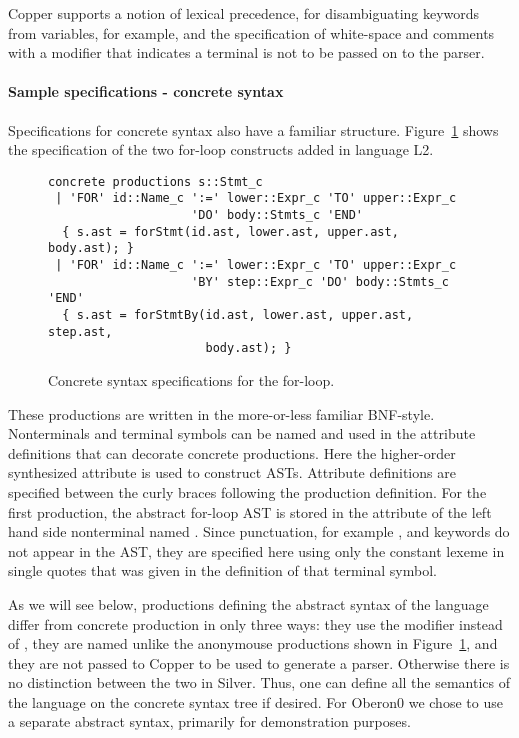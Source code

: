 Copper supports a notion of lexical precedence, for disambiguating
keywords from variables, for example, and the specification of
white-space and comments with a  modifier that indicates
a terminal is not to be passed on to the parser.


\paragraph{Sample specifications - concrete syntax}
Specifications for concrete syntax also have a familiar structure.
Figure~\ref{silver:fig:concrete} shows the specification of the two
for-loop constructs added in language L2.
\begin{figure}
\begin{verbatim}
concrete productions s::Stmt_c
 | 'FOR' id::Name_c ':=' lower::Expr_c 'TO' upper::Expr_c
                    'DO' body::Stmts_c 'END'         
  { s.ast = forStmt(id.ast, lower.ast, upper.ast, body.ast); }
 | 'FOR' id::Name_c ':=' lower::Expr_c 'TO' upper::Expr_c
                    'BY' step::Expr_c 'DO' body::Stmts_c 'END' 
  { s.ast = forStmtBy(id.ast, lower.ast, upper.ast, step.ast, 
                      body.ast); }
\end{verbatim}
\caption{Concrete syntax specifications for the for-loop.}
\label{silver:fig:concrete}
\end{figure}
These productions are written in the more-or-less familiar BNF-style.
Nonterminals and terminal symbols can be named and used in the
attribute definitions that can decorate concrete productions.  Here the
higher-order synthesized  attribute is used to construct
ASTs.  Attribute definitions are specified between the curly braces
following the production definition.
%
For the first production, the abstract for-loop AST is stored
in the  attribute of the left hand side nonterminal named
. Since punctuation, for example \code{:=}, and keywords do
not appear in the AST, they are specified here using only the constant
lexeme in single quotes that was given in the definition of that
terminal symbol.

As we will see below, productions defining the abstract syntax of the
language differ from concrete production in only three ways: they use
the  modifier instead of , they are named
unlike the anonymouse productions shown in
Figure~\ref{silver:fig:concrete}, and they are not passed to Copper to
be used to generate a parser.  Otherwise there is no distinction
between the two in Silver.  Thus, one can define all the semantics of
the language on the concrete syntax tree if desired.  For Oberon0 we
chose to use a separate abstract syntax, primarily for demonstration
purposes.



